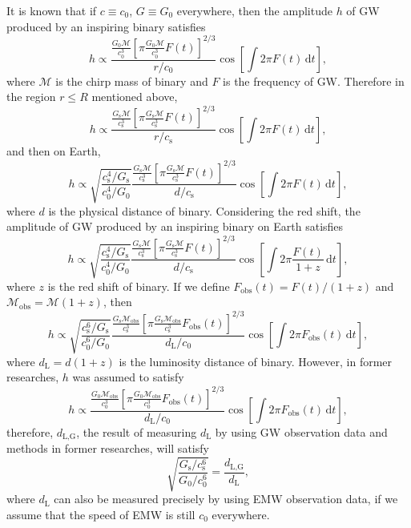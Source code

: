 \documentclass{article}
\def\d{\mathrm{d}}
\begin{document}
It is known that if $c\equiv c_0$, $G\equiv G_0$ everywhere, then the amplitude $h$ of GW produced by an inspiring binary satisfies
\begin{equation}
    h\propto\frac{\frac{G_0\mathcal{M}}{c_0^3}[\pi \frac{G_0\mathcal{M}}{c_0^3}F(t)]^{2/3}}{r/c_0}\cos[\int 2\pi F(t)\,\d t],
\end{equation}
where $\mathcal{M}$ is the chirp mass of binary and $F$ is the frequency of GW. Therefore in the region $r\leq R$ mentioned above,
\begin{equation}
    h\propto\frac{\frac{G_\text{s}\mathcal{M}}{c_\text{s}^3}[\pi \frac{G_\text{s}\mathcal{M}}{c_\text{s}^3}F(t)]^{2/3}}{r/c_\text{s}}\cos[\int 2\pi F(t)\,\d t],
\end{equation}
and then on Earth,
\begin{equation}
    h\propto\sqrt{\frac{c_\text{s}^4/G_\text{s}}{c_0^4/G_0}}\frac{\frac{G_\text{s}\mathcal{M}}{c_\text{s}^3}[\pi \frac{G_\text{s}\mathcal{M}}{c_\text{s}^3}F(t)]^{2/3}}{d/c_\text{s}}\cos[\int 2\pi F(t)\,\d t],
\end{equation}
where $d$ is the physical distance of binary. Considering the red shift, the amplitude of GW produced by an inspiring binary on Earth satisfies
\begin{equation}
    h\propto\sqrt{\frac{c_\text{s}^4/G_\text{s}}{c_0^4/G_0}}\frac{\frac{G_\text{s}\mathcal{M}}{c_\text{s}^3}[\pi \frac{G_\text{s}\mathcal{M}}{c_\text{s}^3}F(t)]^{2/3}}{d/c_\text{s}}\cos[\int 2\pi \frac{F(t)}{1+z}\,\d t],
\end{equation}
where $z$ is the red shift of binary. If we define $F_\text{obs}(t)=F(t)/(1+z)$ and $\mathcal{M}_\text{obs}=\mathcal{M}(1+z)$, then
\begin{equation}
    h\propto\sqrt{\frac{c_\text{s}^6/G_\text{s}}{c_0^6/G_0}}\frac{\frac{G_\text{s}\mathcal{M}_\text{obs}}{c_\text{s}^3}[\pi \frac{G_\text{s}\mathcal{M}_\text{obs}}{c_\text{s}^3}F_\text{obs}(t)]^{2/3}}{d_\text{L}/c_0}\cos[\int 2\pi F_\text{obs}(t)\,\d t],
\end{equation}
where $d_\text{L}=d(1+z)$ is the luminosity distance of binary. However, in former researches, $h$ was assumed to satisfy
\begin{equation}
    h\propto\frac{\frac{G_0\mathcal{M}_\text{obs}}{c_0^3}[\pi \frac{G_0\mathcal{M}_\text{obs}}{c_0^3}F_\text{obs}(t)]^{2/3}}{d_\text{L}/c_0}\cos[\int 2\pi F_\text{obs}(t)\,\d t],
\end{equation}
therefore, $d_\text{L,G}$, the result of measuring $d_\text{L}$ by using GW observation data and methods in former researches, will satisfy
\begin{equation}
    \sqrt{\frac{G_\text{s}/c_\text{s}^6}{G_0/c_0^6}}=\frac{d_\text{L,G}}{d_\text{L}},
\end{equation}
where $d_\text{L}$ can also be measured precisely by using EMW observation data, if we assume that the speed of EMW is still $c_0$ everywhere.
\end{document}
